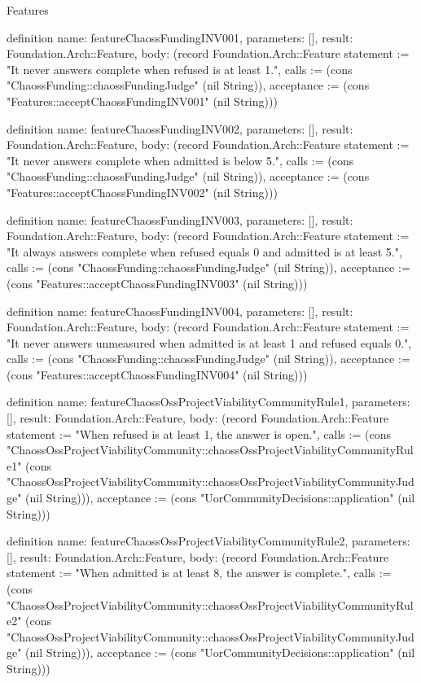 \begin{lexlean}{Features}
\begin{semanticmodule}
definition{
  name: featureChaossFundingINV001,
  parameters: [],
  result: Foundation.Arch::Feature,
  body: (record Foundation.Arch::Feature {statement := "It never answers complete when refused is at least 1.", calls := (cons "ChaossFunding::chaossFundingJudge" (nil String)), acceptance := (cons "Features::acceptChaossFundingINV001" (nil String))})
}

definition{
  name: featureChaossFundingINV002,
  parameters: [],
  result: Foundation.Arch::Feature,
  body: (record Foundation.Arch::Feature {statement := "It never answers complete when admitted is below 5.", calls := (cons "ChaossFunding::chaossFundingJudge" (nil String)), acceptance := (cons "Features::acceptChaossFundingINV002" (nil String))})
}

definition{
  name: featureChaossFundingINV003,
  parameters: [],
  result: Foundation.Arch::Feature,
  body: (record Foundation.Arch::Feature {statement := "It always answers complete when refused equals 0 and admitted is at least 5.", calls := (cons "ChaossFunding::chaossFundingJudge" (nil String)), acceptance := (cons "Features::acceptChaossFundingINV003" (nil String))})
}

definition{
  name: featureChaossFundingINV004,
  parameters: [],
  result: Foundation.Arch::Feature,
  body: (record Foundation.Arch::Feature {statement := "It never answers unmeasured when admitted is at least 1 and refused equals 0.", calls := (cons "ChaossFunding::chaossFundingJudge" (nil String)), acceptance := (cons "Features::acceptChaossFundingINV004" (nil String))})
}

definition{
  name: featureChaossOssProjectViabilityCommunityRule1,
  parameters: [],
  result: Foundation.Arch::Feature,
  body: (record Foundation.Arch::Feature {statement := "When refused is at least 1, the answer is open.", calls := (cons "ChaossOssProjectViabilityCommunity::chaossOssProjectViabilityCommunityRule1" (cons "ChaossOssProjectViabilityCommunity::chaossOssProjectViabilityCommunityJudge" (nil String))), acceptance := (cons "UorCommunityDecisions::application" (nil String))})
}

definition{
  name: featureChaossOssProjectViabilityCommunityRule2,
  parameters: [],
  result: Foundation.Arch::Feature,
  body: (record Foundation.Arch::Feature {statement := "When admitted is at least 8, the answer is complete.", calls := (cons "ChaossOssProjectViabilityCommunity::chaossOssProjectViabilityCommunityRule2" (cons "ChaossOssProjectViabilityCommunity::chaossOssProjectViabilityCommunityJudge" (nil String))), acceptance := (cons "UorCommunityDecisions::application" (nil String))})
}


\end{semanticmodule}
\end{lexlean}
